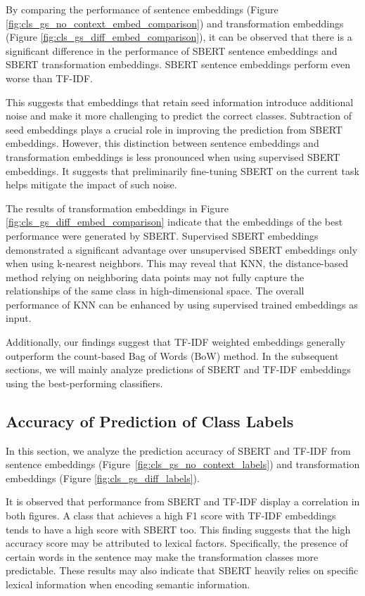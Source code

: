 \documentclass[11pt]{article}
\begin{document}
By comparing the performance of sentence embeddings (Figure \ref{fig:cls_gs_no_context_embed_comparison}) and transformation embeddings (Figure \ref{fig:cls_gs_diff_embed_comparison}), it can be observed that there is a significant difference in the performance of SBERT sentence embeddings and SBERT transformation embeddings. SBERT sentence embeddings perform even worse than TF-IDF. 

This suggests that embeddings that retain seed information introduce additional noise and make it more challenging to predict the correct classes. Subtraction of seed embeddings plays a crucial role in improving the prediction from SBERT embeddings. However, this distinction between sentence embeddings and transformation embeddings is less pronounced when using supervised SBERT embeddings. It suggests that preliminarily fine-tuning SBERT on the current task helps mitigate the impact of such noise.

The results of transformation embeddings in Figure \ref{fig:cls_gs_diff_embed_comparison} indicate that the embeddings of the best performance were generated by SBERT. Supervised SBERT embeddings demonstrated a significant advantage over unsupervised SBERT embeddings only when using k-nearest neighbors. This may reveal that KNN, the distance-based method relying on neighboring data points may not fully capture the relationships of the same class in high-dimensional space. The overall performance of KNN can be enhanced by using supervised trained embeddings as input.

Additionally, our findings suggest that TF-IDF weighted embeddings generally outperform the count-based Bag of Words (BoW) method. In the subsequent sections, we will mainly analyze predictions of SBERT and TF-IDF embeddings using the best-performing classifiers.

\subsection{Accuracy of Prediction of Class Labels}


In this section,  we analyze the prediction accuracy of SBERT and TF-IDF from sentence embeddings (Figure~\ref{fig:cls_gs_no_context_labels}) and transformation embeddings (Figure \ref{fig:cls_gs_diff_labels}). 

It is observed that performance from SBERT and TF-IDF display a correlation in both figures. A class that achieves a high F1 score with TF-IDF embeddings tends to have a high score with SBERT too. This finding suggests that the high accuracy score may be attributed to lexical factors. Specifically, the presence of certain words in the sentence may make the transformation classes more predictable. These results may also indicate that SBERT heavily relies on specific lexical information when encoding semantic information.
\end{document}

